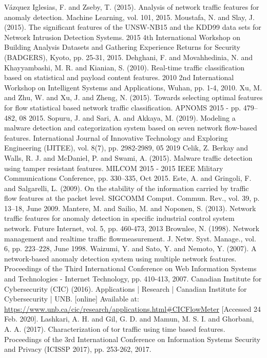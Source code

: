 \documentclass[conference]{IEEEtran}
\begin{document}
\begin{thebibliography}{00}
 Vázquez Iglesias, F. and Zseby, T. (2015). Analysis of network traffic features for anomaly detection. Machine Learning, vol. 101, 2015.
 Moustafa, N. and Slay, J. (2015). The significant features of the UNSW-NB15 and the KDD99 data sets for Network Intrusion Detection Systems. 2015 4th International Workshop on Building Analysis Datasets and Gathering Experience Returns for Security (BADGERS), Kyoto, pp. 25-31, 2015.
 Dehghani, F. and Movahhedinia, N. and Khayyambashi, M. R. and Kianian, S. (2010). Real-time traffic classification based on statistical and payload content features. 2010 2nd International Workshop on Intelligent Systems and Applications, Wuhan, pp. 1-4, 2010.
 Xu, M. and Zhu, W. and Xu, J. and Zheng, N. (2015). Towards selecting optimal features for flow statistical based network traffic classification. APNOMS 2015 - pp. 479–482, 08 2015.
 Sopuru, J. and Sari, A. and Akkaya, M. (2019). Modeling a malware detection and categorization system based on seven network flow-based features. International Journal of Innovative Technology and Exploring Engineering (IJITEE), vol. 8(7), pp. 2982-2989, 05 2019
 Celik, Z. Berkay and Walls, R. J. and McDaniel, P. and Swami, A. (2015). Malware traffic detection using tamper resistant features. MILCOM 2015 - 2015 IEEE Military Communications Conference, pp. 330–335, Oct 2015.
 Este, A. and Gringoli, F. and Salgarelli, L. (2009). On the stability of the information carried by traffic flow features at the packet level. SIGCOMM Comput. Commun. Rev., vol. 39, p. 13–18, June 2009.
 Mantere, M. and Sailio, M. and Noponen, S. (2013). Network traffic features for anomaly detection in specific industrial control system network. Future Internet, vol. 5, pp. 460-473, 2013
 Brownlee, N. (1998). Network management and realtime traffic flowmeasurement. J. Netw. Syst. Manage., vol. 6, pp. 223–228, June 1998.
 Waizumi, Y. and Sato, Y. and Nemoto, Y. (2007). A network-based anomaly detection system using multiple network features. Proceedings of the Third International Conference on Web Information Systems and Technologies - Internet Technology, pp. 410-413, 2007.
 Canadian Institute for Cybersecurity (CIC) (2016). Applications | Research | Canadian Institute for Cybersecurity | UNB. [online] Available at: \url{https://www.unb.ca/cic/research/applications.html#CICFlowMeter} [Accessed 24 Feb. 2020].
 Lashkari, A. H. and Gil, G. D. and Mamun, M. S. I. and Ghorbani, A. A. (2017). Characterization of tor traffic using time based features. Proceedings of the 3rd International Conference on Information Systems Security and Privacy (ICISSP 2017), pp. 253-262, 2017.

\end{thebibliography}
\end{document}
